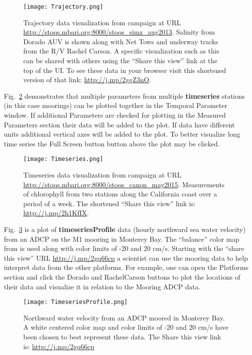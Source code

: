 \documentclass[conference]{IEEEtran}
\begin{document}
\begin{figure}[htbp]
\centering
\texttt{[image: Trajectory.png]}
\caption{Trajectory data visualization from campaign at URL \url{http://stoqs.mbari.org:8000/stoqs_simz_aug2013}.
Salinity from Dorado AUV is shown along with Net Tows and underway tracks from the R/V Rachel Carson.
A specific visualization such as this can be shared with others using the ``Share this view'' link at the
top of the UI. To see these data in your browser visit this shortened version of that link: \url{http://j.mp/2ggZ3nO}.}
\label{fig:Trajectory}
\end{figure}

Fig.~\ref{fig:Timeseries} demonstrates that multiple parameters from multiple \textbf{timeseries} stations
(in this case moorings) can be plotted together in the Temporal Parameter window. If additional Parameters
are checked for plotting in the Measured Parameters section their data will be added to the plot.
If data have different units additional vertical axes will be added to the plot.
To better visualize long time series the Full Screen button button above the plot may be clicked.

\begin{figure}[htbp]
\centering
\texttt{[image: Timeseries.png]}
\caption{Timeseries data visualization from campaign at URL \url{http://stoqs.mbari.org:8000/stoqs_canon_may2015}.
Measurements of chlorophyll from two stations along the California coast over a period of a week.
The shortened ``Share this view'' link is: \url{http://j.mp/2h1KfIX}.}
\label{fig:Timeseries}
\end{figure}

Fig.~\ref{fig:TimeseriesProfile} is a plot of \textbf{timeseriesProfile} data (hourly northward sea water velocity)
from an ADCP on the M1 mooring in Monterey Bay. The ``balance'' color map from \cite{cmocean} is used along with 
color limits of -20 and 20 cm/s. Starting with the ``share this view'' URL \url{http://j.mp/2gq66cp} a scientist
can use the mooring data to help interpret data from the other platforms. For example, one can open the
Platforms section and click the Dorado and RachelCarson buttons to plot the locations of their data and
visualize it in relation to the Mooring ADCP data.

\begin{figure}[htbp]
\centering
\texttt{[image: TimeseriesProfile.png]}
\caption{Northward water velocity from an ADCP moored in Monterey Bay. A white centered color map and color
limits of -20 and 20 cm/s have been chosen to best represent these data. The Share this view link is: \url{http://j.mp/2gq66cp}}
\label{fig:TimeseriesProfile}
\end{figure}
\end{document}
